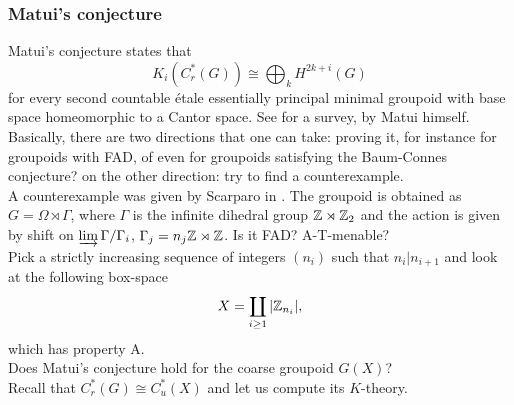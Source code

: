 \subsubsection*{Matui's conjecture}

Matui's conjecture states that 
\[K_i (C_r^*(G)) \cong \bigoplus_k H^{2k+i}(G)\]
for every second countable \'etale essentially principal minimal groupoid with base space homeomorphic to a Cantor space. See \cite{MatuiSurvey} for a survey, by Matui himself.\\

Basically, there are two directions that one can take: proving it, for instance for groupoids with FAD, of even for groupoids satisfying the Baum-Connes conjecture? on the other direction: try to find a counterexample.\\

A counterexample was given by Scarparo in \cite{scarparo2018homology}. The groupoid is obtained as $G=\Omega \rtimes \Gamma$, where $\Gamma$ is the infinite dihedral group $\mathbb Z\rtimes \mathbb Z_2$ and the action is given by shift on $\varinjlim \Gamma/ \Gamma_i$, $\Gamma_j = n_j \mathbb Z \rtimes \mathbb Z$. Is it FAD? A-T-menable?\\

Pick a strictly increasing sequence of integers $(n_i)$ such that $n_i | n_{i+1}$ and look at the following box-space
\[X = \coprod_{i\geq 1} | \mathbb Z_{n_i}|,\]
which has property A.\\

Does Matui's conjecture hold for the coarse groupoid $G(X)$?\\ 

Recall that $C^*_r(G) \cong C_u^*(X)$ and let us compute its $K$-theory. \\

